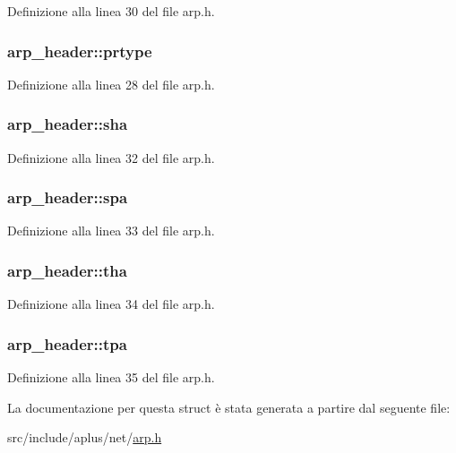 Definizione alla linea 30 del file arp.\+h.

\hypertarget{structarp__header_aa1b4067ef393ffcada7937d04546570e}{
\subsubsection[{prtype}]{ arp\+\_\+header\+::prtype}}\label{structarp__header_aa1b4067ef393ffcada7937d04546570e}


Definizione alla linea 28 del file arp.\+h.

\hypertarget{structarp__header_a1e1ad1e3d78b390d8f31b83cc2d48adc}{
\subsubsection[{sha}]{ arp\+\_\+header\+::sha}}\label{structarp__header_a1e1ad1e3d78b390d8f31b83cc2d48adc}


Definizione alla linea 32 del file arp.\+h.

\hypertarget{structarp__header_a339356e9ca215db53a3491288ffac730}{
\subsubsection[{spa}]{ arp\+\_\+header\+::spa}}\label{structarp__header_a339356e9ca215db53a3491288ffac730}


Definizione alla linea 33 del file arp.\+h.

\hypertarget{structarp__header_a013af95c55ed102d198feeab64ce45ee}{
\subsubsection[{tha}]{ arp\+\_\+header\+::tha}}\label{structarp__header_a013af95c55ed102d198feeab64ce45ee}


Definizione alla linea 34 del file arp.\+h.

\hypertarget{structarp__header_aedc5d2cdff377ab3192ed264d060e914}{
\subsubsection[{tpa}]{ arp\+\_\+header\+::tpa}}\label{structarp__header_aedc5d2cdff377ab3192ed264d060e914}


Definizione alla linea 35 del file arp.\+h.



La documentazione per questa struct è stata generata a partire dal seguente file\+:\begin{DoxyCompactItemize}
\item 
src/include/aplus/net/\hyperlink{arp_8h}{arp.\+h}\end{DoxyCompactItemize}
